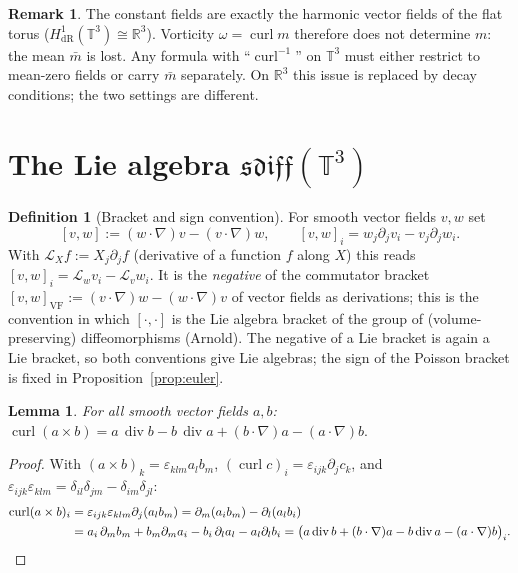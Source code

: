 \documentclass[11pt]{article}
\newtheorem{lemma}[theorem]{Lemma}
\theoremstyle{definition}
\newtheorem{definition}[theorem]{Definition}
\newtheorem{remark}[theorem]{Remark}
\newcommand{\T}{\mathbb{T}^3}
\newcommand{\R}{\mathbb{R}}
\newcommand{\curl}{\operatorname{curl}}
\renewcommand{\div}{\operatorname{div}}
\newcommand{\Lie}{\mathcal{L}}
\begin{document}
\begin{remark}
The constant fields are exactly the harmonic vector fields of the flat torus ($H^1_{\mathrm{dR}}(\T)\cong\R^3$).
Vorticity $\omega=\curl m$ therefore does not determine $m$: the mean $\bar m$ is lost. Any
formula with ``$\curl^{-1}$'' on $\T$ must either restrict to mean-zero fields or carry $\bar m$
separately. On $\R^3$ this issue is replaced by decay conditions; the two settings are different.
\end{remark}

\section{The Lie algebra $\mathfrak{sdiff}(\T)$}\label{sec:lie}
\begin{definition}[Bracket and sign convention]
For smooth vector fields $v,w$ set
\begin{equation}\label{eq:bracket}
[v,w]:=(w\cdot\nabla)v-(v\cdot\nabla)w,\qquad [v,w]_i=w_j\partial_jv_i-v_j\partial_jw_i .
\end{equation}
With $\Lie_X f:=X_j\partial_jf$ (derivative of a function $f$ along $X$) this reads
$[v,w]_i=\Lie_w v_i-\Lie_v w_i$. It is the \emph{negative} of the commutator bracket
$[v,w]_{\mathrm{VF}}:=(v\cdot\nabla)w-(w\cdot\nabla)v$ of vector fields as derivations; this is the
convention in which $[\cdot,\cdot]$ is the Lie algebra bracket of the group of (volume-preserving)
diffeomorphisms (Arnold). The negative of a Lie bracket is again a Lie bracket, so both conventions
give Lie algebras; the sign of the Poisson bracket is fixed in Proposition~\ref{prop:euler}.
\end{definition}

\begin{lemma}\label{lem:curlcross}
For all smooth vector fields $a,b$:
$\curl(a\times b)=a\,\div b-b\,\div a+(b\cdot\nabla)a-(a\cdot\nabla)b.$
\end{lemma}
\begin{proof}
With $(a\times b)_k=\varepsilon_{klm}a_lb_m$, $(\curl c)_i=\varepsilon_{ijk}\partial_jc_k$, and
$\varepsilon_{ijk}\varepsilon_{klm}=\delta_{il}\delta_{jm}-\delta_{im}\delta_{jl}$:
\begin{align*}
\curl(a\times b)_i&=\varepsilon_{ijk}\varepsilon_{klm}\partial_j(a_lb_m)
=\partial_m(a_ib_m)-\partial_l(a_lb_i)\\
&=a_i\,\partial_mb_m+b_m\partial_ma_i-b_i\,\partial_la_l-a_l\partial_lb_i
=\big(a\div b+(b\cdot\nabla)a-b\div a-(a\cdot\nabla)b\big)_i.\qedhere
\end{align*}
\end{proof}
\end{document}
